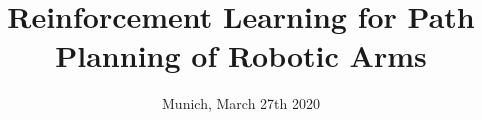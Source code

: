 %
% 
% 
%






\renewcommand{\PersonTitel}{}
\newcommand{\Datum}{\today}

\renewcommand{\PraesentationFusszeileZusatz}{| RL for Robotic Arms}
\title{Reinforcement Learning for Path Planning of
	Robotic Arms}
\author{\PersonTitel{} \PersonVorname{} \PersonNachname}
\institute[]{\UniversitaetName \\ \FakultaetName \\ \LehrstuhlName}
\date[\Datum]{Munich, March 27th 2020}
\subject{Reinforcement Learning for Path Planning of
	Robotic Arms}




\PraesentationMasterStandard

\PraesentationTitelseite %


%


